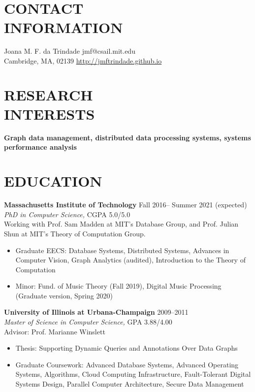 \documentclass[line,margin]{res}
\begin{document}

\begin{resume}

\section{CONTACT \\ INFORMATION}  Joana M. F. da Trindade \hfill jmf@csail.mit.edu \\
  Cambridge, MA, 02139 \hfill \url{http://jmftrindade.github.io}

\section{RESEARCH \\ INTERESTS} \textbf{Graph data management, distributed data processing systems, systems performance analysis}

\section{EDUCATION} \textbf{Massachusetts Institute of Technology} \hfill Fall 2016-- Summer 2021 (expected) \\
  {\sl PhD in Computer Science,} CGPA 5.0/5.0 \\
  Working with Prof. Sam Madden at MIT's Database Group, and Prof. Julian Shun at MIT's Theory of Computation Group.
  \begin{itemize}  \itemsep -2pt
  \item Graduate EECS: Database Systems, Distributed Systems, Advances in Computer Vision, Graph Analytics (audited), Introduction to the Theory of Computation
  \item Minor: Fund. of Music Theory (Fall 2019), Digital Music Processing (Graduate version, Spring 2020)
  \end{itemize}

  \textbf{University of Illinois at Urbana-Champaign} \hfill 2009--2011 \\
  {\sl Master of Science in Computer Science,}  GPA 3.88/4.00 \\
  Advisor: Prof. Marianne Winslett
  \begin{itemize}  \itemsep -2pt
  \item Thesis: Supporting Dynamic Queries and Annotations Over Data Graphs
  \item Graduate Coursework: Advanced Database Systems, Advanced Operating Systems, Algorithms, Cloud Computing Infrastructure, Fault-Tolerant Digital Systems Design, Parallel Computer Architecture, Secure Data Management
  \end{itemize}


\end{resume}
\end{document}
